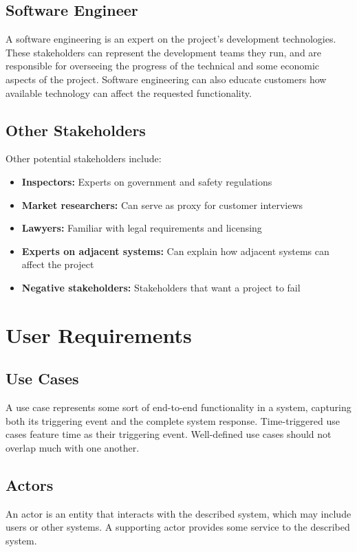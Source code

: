 \documentclass[12pt,titlepage]{article}
\let\stdsection\section
\renewcommand\section{\clearpage\stdsection}
\begin{document}
    \subsection{Software Engineer}
      A software engineering is an expert on the project's development technologies. These stakeholders can represent the development teams they run, and
      are responsible for overseeing the progress of the technical and some economic aspects of the project. Software engineering can also educate customers
      how available technology can affect the requested functionality.

    \subsection{Other Stakeholders}
      Other potential stakeholders include:
      \begin{itemize}
        \item \textbf{Inspectors:} Experts on government and safety regulations
        \item \textbf{Market researchers:} Can serve as proxy for customer interviews
        \item \textbf{Lawyers:} Familiar with legal requirements and licensing
        \item \textbf{Experts on adjacent systems:} Can explain how adjacent systems can affect the project
        \item \textbf{Negative stakeholders:} Stakeholders that want a project to fail
      \end{itemize}

  \section{User Requirements}

    \subsection{Use Cases}
      A use case represents some sort of end-to-end functionality in a system, capturing both its triggering event and the complete system response.
      Time-triggered use cases feature time as their triggering event. Well-defined use cases should not overlap much with one another.

      \subsection{Actors}
        An actor is an entity that interacts with the described system, which may include users or other systems. A supporting actor provides some service to the
        described system.
\end{document}

